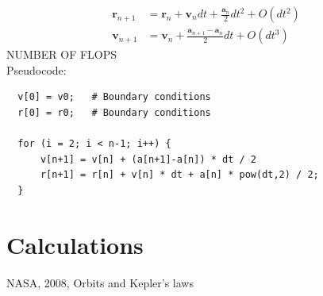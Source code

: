 \documentclass{article}
\begin{document}
\begin{align*}
    \mathbf{r}_{n+1}&=\mathbf{r}_n+\mathbf{v}_ndt+\frac{\mathbf{a}_n}{2}dt^2+O(dt^2)\\
    \mathbf{v}_{n+1}&=\mathbf{v}_n+\frac{\mathbf{a}_{n+1}-\mathbf{a}_n}{2}dt+O(dt^3)
\end{align*}
NUMBER OF FLOPS
\\
Pseudocode:

\begin{verbatim}
  v[0] = v0;   # Boundary conditions
  r[0] = r0;   # Boundary conditions

  for (i = 2; i < n-1; i++) {
      v[n+1] = v[n] + (a[n+1]-a[n]) * dt / 2
      r[n+1] = r[n] + v[n] * dt + a[n] * pow(dt,2) / 2;
  }

\end{verbatim}

\section{Calculations} 

\begin{thebibliography}{9}
	NASA, 2008, Orbits and Kepler's laws
\end{thebibliography}
\end{document}
